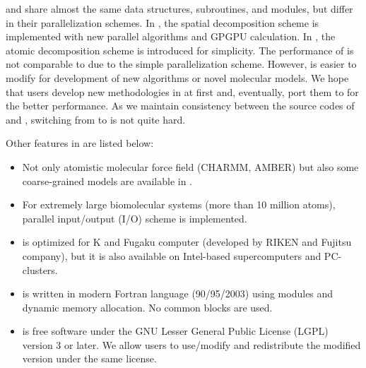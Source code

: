 \documentclass[a4paper,11pt,oneside,english]{sphinxmanual}
\begin{document}
 and  share almost the same data structures, subroutines,
and modules, but differ in their parallelization schemes.
In , the spatial decomposition scheme is implemented with new
parallel algorithms   and GPGPU calculation.
In , the atomic decomposition scheme is introduced for simplicity.
The performance of  is not comparable to  due to the
simple parallelization scheme.
However,  is easier to modify for development of new algorithms
or novel molecular models. We hope that users develop new methodologies
in  at first and, eventually, port them to  for the
better performance.  As we maintain consistency between the source codes
of  and , switching from  to  is
not quite hard.

Other features in  are listed below:
\begin{itemize}
\item {} 
Not only atomistic molecular force field (CHARMM, AMBER) but
also some coarse-grained models are available in .

\item {} 
For extremely large biomolecular systems (more than 10 million
atoms), parallel input/output (I/O) scheme is implemented.

\item {} 
 is optimized for K and Fugaku computer (developed by RIKEN and
Fujitsu company), but it is also available on Intel-based supercomputers
and PC-clusters.

\item {} 
 is written in modern Fortran language (90/95/2003)
using modules and dynamic memory allocation. No common blocks are used.

\item {} 
 is free software under the GNU Lesser General Public License (LGPL)
version 3 or later. We allow users to use/modify  and
redistribute the modified version under the same license.

\end{itemize}
\end{document}
